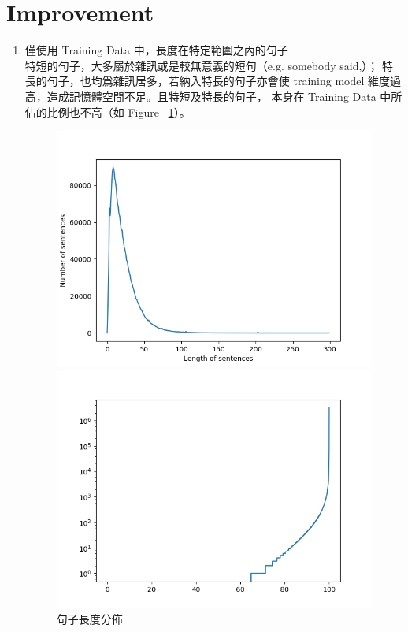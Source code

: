 \documentclass[12pt, a4paper]{article}
\theoremstyle{mystyle}	%
\begin{document}
\section{Improvement}
\begin{enumerate}
  \item 僅使用 Training Data 中，長度在特定範圍之內的句子\\
    特短的句子，大多屬於雜訊或是較無意義的短句（e.g. somebody said,）；
    特長的句子，也均爲雜訊居多，若納入特長的句子亦會使 training model
    維度過高，造成記憶體空間不足。且特短及特長的句子，
    本身在 Training Data 中所佔的比例也不高（如 Figure ~\ref{fig:sentLenDis}）。
    \begin{figure}[!htb]
      \centering
       \includegraphics[scale=0.37]{sent_len_dis.png}
       \caption{句子長度分佈}
       \label{fig:sentLenDis}
      \endminipage\hfill
        \includegraphics[scale=0.37]{word_dis2.png}

\end{figure}
\end{enumerate}
\end{document}
